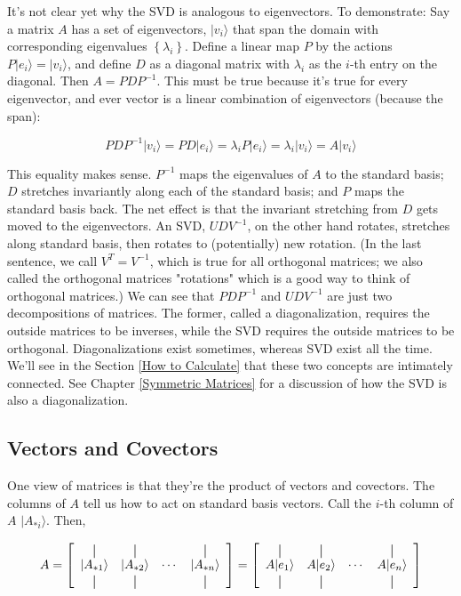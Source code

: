 \documentclass{amsbook}
\newcommand*{\vertbar}{\rule[-1ex]{0.5pt}{2.5ex}}
\begin{document}
It's not clear yet why the SVD is analogous to eigenvectors.  To demonstrate:  Say a matrix $A$ has a set of eigenvectors, $|v_i\rangle$ that span the domain with corresponding eigenvalues $\left\{\lambda_i\right\}$.  Define a linear map $P$ by the actions $P|e_i\rangle=|v_i\rangle$, and define $D$ as a diagonal matrix with $\lambda_i$ as the $i$-th entry on the diagonal.  Then $A=PDP^{-1}$.  This must be true because it's true for every eigenvector, and ever vector is a linear combination of eigenvectors (because the span):

$$
PDP^{-1}|v_i\rangle = PD|e_i\rangle = \lambda_iP|e_i\rangle = \lambda_i|v_i\rangle = A|v_i\rangle
$$

This equality makes sense.  $P^{-1}$ maps the eigenvalues of $A$ to the standard basis; $D$ stretches invariantly along each of the standard basis; and $P$ maps the standard basis back.  The net effect is that the invariant stretching from $D$ gets moved to the eigenvectors.  An SVD, $UDV^{-1}$, on the other hand rotates, stretches along standard basis, then rotates to (potentially) new rotation.  (In the last sentence, we call $V^T=V^{-1}$, which is true for all orthogonal matrices; we also called the orthogonal matrices "rotations" which is a good way to think of orthogonal matrices.)  We can see that $PDP^{-1}$ and $UDV^{-1}$ are just two decompositions of matrices.  The former, called a diagonalization, requires the outside matrices to be inverses, while the SVD requires the outside matrices to be orthogonal.  Diagonalizations exist sometimes, whereas SVD exist all the time.  We'll see in the Section \ref{How to Calculate} that these two concepts are intimately connected.  See Chapter \ref{Symmetric Matrices} for a discussion of how the SVD is also a diagonalization.

\subsection{Vectors and Covectors}

One view of matrices is that they're the product of vectors and covectors.  The columns of $A$ tell us how to act on standard basis vectors.  Call the $i$-th column of $A$ $|A_{*i}\rangle$.  Then,

$$
A = 
\left[
  \begin{array}{cccc}
    \vertbar & \vertbar & & \vertbar \\
    |A_{*1}\rangle  & |A_{*2}\rangle & \cdots & |A_{*n}\rangle \\
    \vertbar & \vertbar & & \vertbar 
  \end{array}
\right] =
\left[
  \begin{array}{cccc}
    \vertbar & \vertbar & & \vertbar \\
    A|e_1\rangle    & A|e_2\rangle   & \cdots & A|e_n\rangle    \\
    \vertbar & \vertbar & & \vertbar 
  \end{array}
\right]
$$
\end{document}
